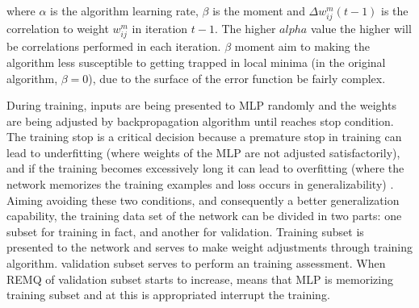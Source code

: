 where $\alpha$ is the algorithm learning rate, $\beta$ is the moment and $\Delta w^m_{ij}(t-1)$ is the correlation to weight $w_{ij}^m$ in iteration $t-1$. The higher $alpha$ value the higher will be correlations performed in each iteration. $\beta$ moment aim to making the algorithm less susceptible to getting trapped in local minima (in the original  algorithm, $\beta = 0$), due to the surface of the error function be fairly complex.

During training, inputs are being presented to MLP randomly and the weights are being adjusted by backpropagation algorithm until reaches stop condition. The training stop is a critical decision because a premature stop in training can lead to underfitting (where weights of the MLP are not adjusted satisfactorily), and if the training becomes excessively long it can lead to overfitting (where the network memorizes the training examples and loss occurs in generalizability) \cite{valenca1995fundamentos}. Aiming avoiding these two conditions, and consequently a better generalization capability, the training data set of the network can be divided in two parts: one subset for training in fact, and another for validation. Training subset is presented to the network and serves to make weight adjustments through training algorithm. validation subset serves to perform an training assessment. When REMQ of validation subset starts to increase, means that MLP is memorizing training subset and at this is appropriated interrupt the training.


